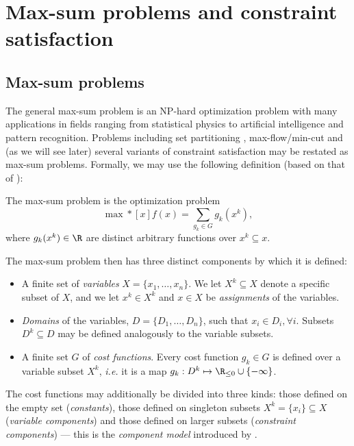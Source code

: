 \section{Max-sum problems and constraint satisfaction}

\subsection{Max-sum problems}
The general max-sum problem is an NP-hard optimization problem with many applications in fields ranging from statistical physics to artificial intelligence and pattern recognition.
Problems including set partitioning \parencite[\pno~107]{Wedelin08}, max-flow/min-cut and (as we will see later) several variants of constraint satisfaction may be restated as max-sum problems.
Formally, we may use the following definition (based on that of \citeauthor{Wedelin08}):
\begin{definition} \label{def:max-sum}
	The max-sum problem is the optimization problem
	\begin{equation*}
		\max*[x] f(x) = \sum_{g_k\in G} g_k(x^k),
	\end{equation*}
	where \(g_k(x^k) \in \R\) are distinct arbitrary functions over \(x^k \subseteq x\).
\end{definition}

The max-sum problem then has three distinct components by which it is defined:
\begin{itemize}
	\item A finite set of \emph{variables} \(X = \{x_1, \dotsc, x_n\}\). We let \(X^k \subseteq X\) denote a specific subset of \(X\), and we let \(x^k \in X^k\) and \(x \in X\) be \emph{assignments} of the variables.
	\item \emph{Domains} of the variables, \(D = \{D_1, \dotsc, D_n\}\), such that \(x_i \in D_i, \forall i\). Subsets \(D^k \subseteq D\) may be defined analogously to the variable subsets.
	\item A finite set \(G\) of \emph{cost functions}. Every cost function \(g_k \in G\) is defined over a variable subset \(X^k\), \emph{i.e.} it is a map \(g_k : D^k \mapsto \Rminus \cup \{-\infty\}\).
\end{itemize}
The cost functions may additionally be divided into three kinds: those defined on the empty set (\emph{constants}), those defined on singleton subsets \(X^k = \{x_i\} \subseteq X\) (\emph{variable components}) and those defined on larger subsets (\emph{constraint components}) --- this is the \emph{component model}\label{pg:component-model} introduced by \textcite[\pno~98]{Wedelin08}.

